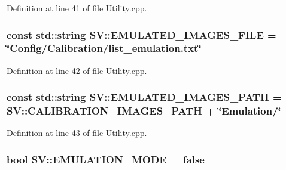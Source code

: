Definition at line 41 of file Utility.\-cpp.

\hypertarget{namespace_s_v_a4a601cd489e8ca00c55bb2785c8bb5d9}{
\subsubsection[{E\-M\-U\-L\-A\-T\-E\-D\-\_\-\-I\-M\-A\-G\-E\-S\-\_\-\-F\-I\-L\-E}]{\setlength{\rightskip}{0pt plus 5cm}const std\-::string S\-V\-::\-E\-M\-U\-L\-A\-T\-E\-D\-\_\-\-I\-M\-A\-G\-E\-S\-\_\-\-F\-I\-L\-E = \char`\"{}Config/Calibration/list\-\_\-emulation.\-txt\char`\"{}}}\label{namespace_s_v_a4a601cd489e8ca00c55bb2785c8bb5d9}


Definition at line 42 of file Utility.\-cpp.

\hypertarget{namespace_s_v_ab98fb68d38e7637f92d456f945dfd2ff}{
\subsubsection[{E\-M\-U\-L\-A\-T\-E\-D\-\_\-\-I\-M\-A\-G\-E\-S\-\_\-\-P\-A\-T\-H}]{\setlength{\rightskip}{0pt plus 5cm}const std\-::string S\-V\-::\-E\-M\-U\-L\-A\-T\-E\-D\-\_\-\-I\-M\-A\-G\-E\-S\-\_\-\-P\-A\-T\-H = {\bf S\-V\-::\-C\-A\-L\-I\-B\-R\-A\-T\-I\-O\-N\-\_\-\-I\-M\-A\-G\-E\-S\-\_\-\-P\-A\-T\-H} + \char`\"{}Emulation/\char`\"{}}}\label{namespace_s_v_ab98fb68d38e7637f92d456f945dfd2ff}


Definition at line 43 of file Utility.\-cpp.

\hypertarget{namespace_s_v_abef27351d2e2c8b13783f080571edca8}{
\subsubsection[{E\-M\-U\-L\-A\-T\-I\-O\-N\-\_\-\-M\-O\-D\-E}]{\setlength{\rightskip}{0pt plus 5cm}bool S\-V\-::\-E\-M\-U\-L\-A\-T\-I\-O\-N\-\_\-\-M\-O\-D\-E = false}}\label{namespace_s_v_abef27351d2e2c8b13783f080571edca8}


